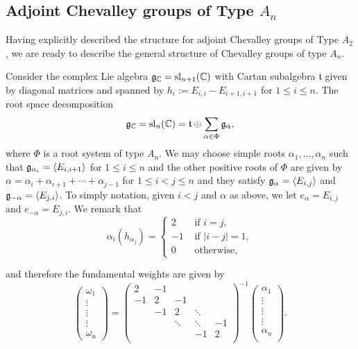 \subsection{Adjoint Chevalley groups of Type $A_n$}

Having explicitly described the structure for adjoint Chevalley groups of Type $A_2$, we are ready to describe the general structure of Chevalley groups of type $A_n$.

Consider the complex Lie algebra $\mathfrak{g}_{\mathbb{C}}=\mathrm{sl}_{n+1}(\mathbb{C})$ with Cartan subalgebra $\mathfrak{t}$ given by diagonal matrices and spanned by $h_i:=E_{i,i}-E_{i+1,i+1}$ for $1\leq i\leq n$. The root space decomposition 
$$\mathfrak{g}_{\mathbb{C}}=\mathrm{sl}_n(\mathbb{C})=\mathfrak{t}\oplus\sum_{\alpha\in\Phi}\mathfrak{g}_{\alpha},$$
where $\Phi$ is a root system of type $A_n$. We may choose simple roots $\alpha_1,\ldots,\alpha_n$ such that $\mathfrak{g}_{\alpha_i}=\langle E_{i,i+1}\rangle$ for $1\leq i\leq n$ and the other positive roots of $\Phi$ are given by $\alpha=\alpha_i+\alpha_{i+1}+\cdots+\alpha_{j-1}$ for $1\leq i< j\leq n$ and they satisfy $\mathfrak{g}_\alpha=\langle E_{i,j}\rangle$ and $\mathfrak{g}_{-\alpha}=\langle E_{j,i}\rangle$. To simply notation, given $i<j$ and $\alpha$ as above, we let $e_\alpha=E_{i,j}$ and $e_{-\alpha}=E_{j,i}$.
We remark that 
$$\alpha_i(h_{\alpha_j})=\begin{cases}
    2 & \text{ if } i=j, \\
    -1 & \text{ if } |i-j|=1,\\
    0 & \text{ otherwise,} 
\end{cases}$$

and therefore the fundamental weights are given by 
\begin{equation}
    \begin{pmatrix}
        \omega_1\\
        \vdots\\
        \vdots\\
        \vdots\\
        \omega_n
    \end{pmatrix}=\begin{pmatrix}
        2 & -1 & & & \\
        -1 & 2 & -1 & &\\
         & -1 & 2 & \ddots & \\
         & & \ddots & \ddots & -1\\
         & & & -1 & 2\\ 
    \end{pmatrix}^{-1}
    \begin{pmatrix}
        \alpha_1\\
        \vdots\\
        \vdots\\
        \vdots\\
        \alpha_n\\
    \end{pmatrix}.
\end{equation}

